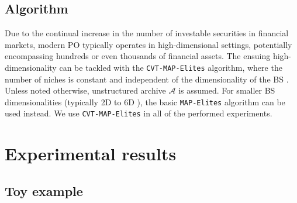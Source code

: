 \subsection{Algorithm}

Due to the continual increase in the number of investable securities in financial markets, modern PO typically operates in high-dimensional settings, potentially encompassing hundreds or even thousands of financial assets. The ensuing high-dimensionality can be tackled with the \verb|CVT-MAP-Elites| algorithm, where the number of niches is constant and independent of the dimensionality of the BS \cite{vassiliades}. Unless noted otherwise, unstructured archive $\mathcal{A}$ is assumed. For smaller BS dimensionalities (typically 2D to 6D \cite{vassiliades}), the basic \verb|MAP-Elites| algorithm \cite{mouret} can be used instead. We use \verb|CVT-MAP-Elites| in all of the performed experiments. 
\section{Experimental results}

\subsection{Toy example}

